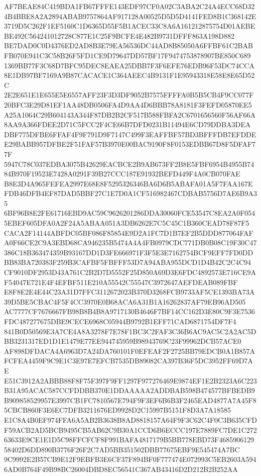 \documentclass[UTF8,fontset=fandol,zihao=-4,a4paper]{ctexart}
\begin{document}
{{AF7BEAE84C419BDA1FB67FFFE143EDF97CF0A02C3ABA2C24A4ECC68D324B4BBE8A2A2894ABAB9757864AF917128A00525D5D5D4141FED8B1C368142E
3719D5C262F1EF5160C1D6365D55F5B1ACEC33C8A6A161212875754D01AEBEBE492C564241012728C877E1C25F9BCFE4E482B9731DFFF863A198D882
BE7DAD0C0D4376ED2AD8B3E79EA56536DC44AD8B85050A6FFBF61C2BABFB070E941C3C58B26F5FD1CE9D79647DD57BF17F9474753878907BE850C689
1369BB77F3C68D7BFC95DEC8EAEA25DBB7F3F6EFE76EDB96F53DC74CCA8E1DB97BF7169A9B87CACACE1C364AEEC4B9131F1E95943318E58E8E65D52C
2E2E651E1E655E5E6557AFF23F3D3DF9052B7575FFFFA0B5B5CB4F9CC077F20BFC3E29D81EF1AA48DB0506FA4D9AA4D6BBB78A8181F3FEFD05870EE5
A25A1064C29B604143A344F87DB2B2CF517B588FBFA2C6701656560F56AF66A8AA9A366FDEE2D71C5FCC2F4CE66B7DFD0231B11494E6CD79DDBA3DEA
DBF775DFBE6FFAF4F9F791D9F7147C499F3EAFFBF57BD3BFFFDB7EFDDEE29BABB957DFBE2F51FAF57B3970E00BAC9190F8F0153EDBB67D8F5DFAF77F
5947C78C037EDBA3075B42629EACBCE2B9AB673FF2B8E5FBF6954B4955B7484B970F19523E7428A0291F39B27CCC187E91932BEFD449F4A0CB070FAE
B8E3D4A965FEFEA2997E68E8F5295326346BA6D6B5ABAFA01A5F7FAA167EFDB46DFB4EF87DAD5BBF27C1E7D0A1CF516982467CDBAB5756D7AE6B9A35
6BF96B8E2FE61716EBD9AC59C9626201286DDA30060FCE53547C8EA2A0F0545EBEF605DFA0A2F24A5ABAA051A3DB6262E7C5C45C1B360CEAD78F87F5
CACA2F14144ABFDC05BF086F85854E9D2A1FC7D1B7EF2B5DDD877064FAFA0F66CE2C9A3EBD68CA946235B5474A4A4FB0979CDC771DB0B08C19F30C47
386C18B363474359B93167DD1D3FE666971F3F5E3E7162754BCF9EFF7FD0DDBB83BA720383F259B3CAFBF5FBFFF53D7A94ABA955DCD1D4B42C2C4C94
CF9010DF2953D43A761C2B2D7D5552F25D850A69D3E6FDC4892573E716CE9AF54047E721E4F4EFBF511E210A55542C55547C3972647AEFDEAB089FBF
E8F8E2E4E44C23A31D7FFC3112672023B370D3268FCB9733AF5CE1393BA73A39D5BE5CBAC4F5F4CC3970E0B68ACA6A31B1A16262837AF79EB96AD505
AC7777CF7676667FB98B8B4B8A9717130B4646F7BF14CC162D3E80C9F3E7536FDC487277675DBE9CECE6968C05944B9792B1EFF71CAD6871754DF7F4
841B0D50569E3A7CE4A8A3278F7E78F1BC3C2FAF3C36B6AC9AC5C2A2AC5DBB3231317ED1D1E1479E77EE944745959B98943769C23F99962DCB57ACE0
AF898DFDACA4A6963D7A24DA760101F0EFEAF2F2725BB79EDCB0A1B857AFCFEA4459F9C9E1C3E97E7EFCB7535DB89082CA397B36F5DC3952FF69D7AE
E51C3912A2ABBB88F8F75F397F9FF1297F977276469E9874EF1E2B2323A6C223B31A95ACAC587CCFDDBB370E1DDAAAAA2ADDBAB598B474577BFBEDB9
B909858529957E3997CB1FC7810567E794F9F3EF6B6B3F2465EAD4877A7A45F85CBCB860F3E6EC7DFB3211676ED9928D2C15997B5151F8D3A7A18585
E1C8A4B0EF974FFA6A5AB2B3638B8AD8818157A64F9F3C62C4F0C3B635CFDF59ACB2AD5BCB9495CB5AB62C9B30A1CCD6B6ECCC197E7889FC7DE1C272
63633E9CE1E1D5C98FFCFCF8F991BAFA4817179B5BB778EBD73F468590612958402D6DD890B3776F26F2C7AD5BB351502DBB77675EBF9E545474A7BC
9C9992E2B57CB9E12F9EBFB3E6CF37F894BF0F777474E072993C5EB2603A5946AD0B764F49B98BC26004DBD8EC56541C367AB43416D2D212B2B252AA
}}
\end{document}

